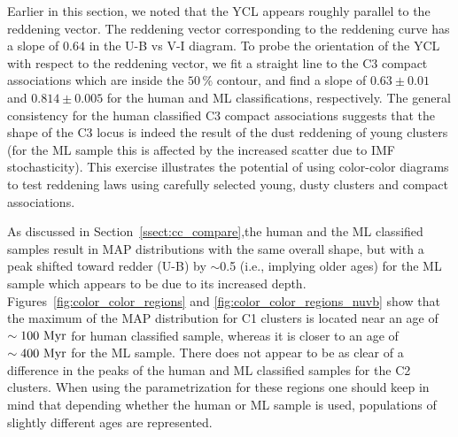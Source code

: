 \documentclass[linenumbers]{aastex63}
\begin{document}
Earlier in this section, we noted that the YCL appears roughly parallel to the reddening vector.
The reddening vector corresponding to the \citet{cardelli_relationship_1989} reddening curve has a slope of $0.64$ in the U-B vs V-I diagram.
To probe the orientation of the YCL with respect to the reddening vector, we fit a straight line to the C3 compact associations which are inside the $50\,\%$ contour, and find a slope of $0.63\pm0.01$ and $0.814\pm0.005$ for the human and ML classifications, respectively. 
The general consistency for the human classified C3 compact associations suggests that the shape of the C3 locus is indeed the result of the dust reddening of young clusters (for the ML sample this is affected by the increased scatter due to IMF stochasticity). This exercise illustrates the potential of using color-color diagrams to test reddening laws using carefully selected young, dusty clusters and compact associations. 


{As discussed in Section~\ref{ssect:cc_compare},the human and the ML classified samples result in MAP distributions with the same overall shape, but with a peak shifted toward redder (U-B) by $\sim$0.5 (i.e., implying older ages) for the ML sample which appears to be due to its increased depth. Figures~\ref{fig:color_color_regions} and \ref{fig:color_color_regions_nuvb} show that the maximum of the MAP distribution for C1 clusters is located near an age of ${\rm \sim 100~Myr}$ for human classified sample, whereas it is closer to an age of ${\rm \sim 400~Myr}$ for the ML sample.  There does not appear to be as clear of a difference in the peaks of the human and ML classified samples for the C2 clusters.  When using the parametrization for these regions  one should keep in mind that depending whether the human or ML sample is used, populations of slightly different ages are represented.}
\end{document}
